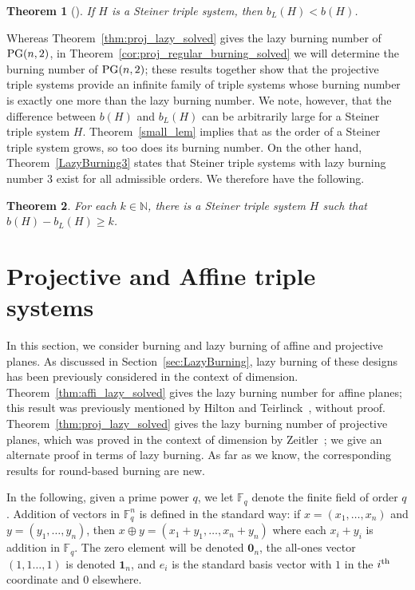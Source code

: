 \documentclass[12pt]{article}
\DeclareMathOperator{\PG}{\rm PG}
\newtheorem{theorem}{Theorem}[section]
\theoremstyle{definition}
\numberwithin{table}{section}
\begin{document}
\begin{theorem} [\cite{introducing_hyp_burn}]
\label{cor:lazyburningUpperbound}
If $H$ is a Steiner triple system, then $b_L(H) < b(H)$.
\end{theorem}


Whereas Theorem~\ref{thm:proj_lazy_solved} gives the lazy burning number of $\PG(n,2)$, in Theorem~\ref{cor:proj_regular_burning_solved} we will determine the burning number of $\PG(n,2)$; these results together show that the projective triple systems provide an infinite family of triple systems whose burning number is exactly one more than the lazy burning number.
We note, however, that the difference between $b(H)$ and $b_L(H)$ can be arbitrarily large for a Steiner triple system $H$.  Theorem~\ref{small_lem} implies that as the order of a Steiner triple system grows, so too does its burning number. On the other hand, Theorem~\ref{LazyBurning3} states that Steiner triple systems with lazy burning number $3$ exist for all admissible orders.  We therefore have the following.

\begin{theorem}
    For each $k \in \mathbb{N}$, there is a Steiner triple system $H$ such that $b(H)-b_L(H) \geq k$.  
\end{theorem}

\section{Projective and Affine triple systems}
\label{sec:AffineProjectiveA}
\label{sec:subsystems}

In this section, we consider burning and lazy burning of affine and projective planes. 
As discussed in Section~\ref{sec:LazyBurning}, lazy burning of these designs has been previously considered in the context of dimension.  
Theorem~\ref{thm:affi_lazy_solved} gives the lazy burning number for affine planes; this result was previously mentioned by 
Hilton and Teirlinck~\cite{HiltonTeirlinck1980}, without proof. 
Theorem~\ref{thm:proj_lazy_solved}  gives the lazy burning number of projective planes, which was proved in the context of dimension by Zeitler~\cite{Zeitler1987}; we give an alternate proof in terms of lazy burning. As far as we know, the corresponding results for round-based burning are new.

In the following, given a prime power $q$, we let $\mathbb{F}_q$ denote the finite field of order $q$. 
Addition of vectors in $\mathbb{F}_q^n$ is defined in the standard way: if ${x}=(x_1,\ldots,x_n)$ and ${y}=(y_1,\ldots,y_n)$, then ${x}\oplus {y}=(x_1+y_1,\ldots,x_n+y_n)$ where each $x_i+y_i$ is addition in $\mathbb{F}_q$. 
The zero element will be denoted $\mathbf{0}_n$, the all-ones vector $(1,1\ldots,1)$ is denoted $\mathbf{1}_{n}$, and ${e}_i$ is the standard basis vector with $1$ in the $i^{\rm th}$ coordinate and $0$ elsewhere. 
\end{document}
